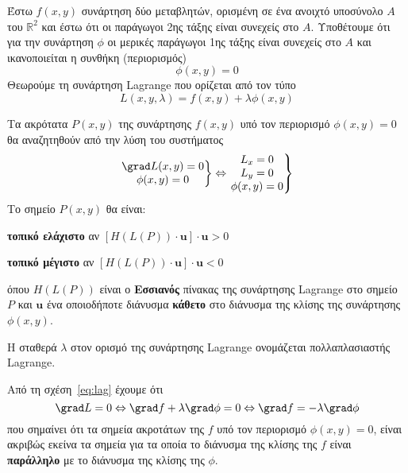 \documentclass[a4paper,table]{report}
\begin{document}
\begin{thm}
  Έστω $ f(x,y) $ συνάρτηση δύο μεταβλητών, ορισμένη σε ένα ανοιχτό 
  υποσύνολο $A$ του $ \mathbb{R}^{2} $ και έστω ότι οι παράγωγοι 2ης τάξης είναι 
  συνεχείς στο $A$. Υποθέτουμε ότι για την συνάρτηση $ \phi $ οι μερικές παράγωγοι 
  1ης τάξης είναι συνεχείς στο $A$ και ικανοποιείται η συνθήκη (περιορισμός)
  \begin{equation}
    \label{eq:constr1}
    \phi (x,y) = 0
  \end{equation}
  Θεωρούμε τη συνάρτηση Lagrange που ορίζεται από τον τύπο
  \[
    L(x,y, \lambda) = f(x,y) + \lambda \phi (x,y) 
  \] 

  Τα ακρότατα $ P(x,y) $ της συνάρτησης $ f(x,y) $ υπό τον περιορισμό $ \phi (x,y)=0 $  
  θα αναζητηθούν από την λύση του συστήματος 
  \begin{equation}\label{eq:lag}
    \left.
      \begin{matrix}
        \grad L(x,y)=0 \\
        \phi (x,y)=0
      \end{matrix} 
    \right\} \Leftrightarrow 
    \left.
      \begin{matrix}
        L_{x}=0 \\
        L_{y}=0 \\
        \phi(x,y)=0
      \end{matrix} 
    \right\}
  \end{equation}
  Το σημείο $ P(x,y) $ θα είναι: 
  \begin{myitemize}
    \item \textbf{τοπικό ελάχιστο} αν $ [H(L(P)) \cdot \mathbf{u}] \cdot \mathbf{u} > 0 $
    \item \textbf{τοπικό μέγιστο} αν $ [H(L(P)) \cdot \mathbf{u}] \cdot \mathbf{u} < 0 $
  \end{myitemize}
όπου $ H(L(P)) $ είναι ο \textbf{Εσσιανός} πίνακας της συνάρτησης Lagrange στο 
σημείο $P$ και $ \mathbf{u} $ ένα οποιοδήποτε διάνυσμα \textbf{κάθετο} στο διάνυσμα της 
κλίσης της συνάρτησης $ \phi(x,y) $.
\end{thm}

\begin{rem}
\item {}
  \begin{myitemize}
    \item Η σταθερά $ \lambda $ στον ορισμό της συνάρτησης Lagrange ονομάζεται 
      \textcolor{Col1}{πολλαπλασιαστής Lagrange}.
    \item  Από τη σχέση~\eqref{eq:lag} έχουμε ότι
      \[
        \grad L = 0 \Leftrightarrow \grad f + \lambda \grad \phi = 0 \Leftrightarrow
        \grad f = - \lambda \grad \phi
      \] 
      που σημαίνει ότι τα σημεία ακροτάτων της $f$ υπό τον περιορισμό $\phi(x,y)=0$, 
      είναι ακριβώς εκείνα τα σημεία για τα οποία το διάνυσμα της κλίσης της $f$ είναι 
      \textbf{παράλληλο} με το διάνυσμα της κλίσης της $ \phi $.
  \end{myitemize}
\end{rem}
\end{document}
